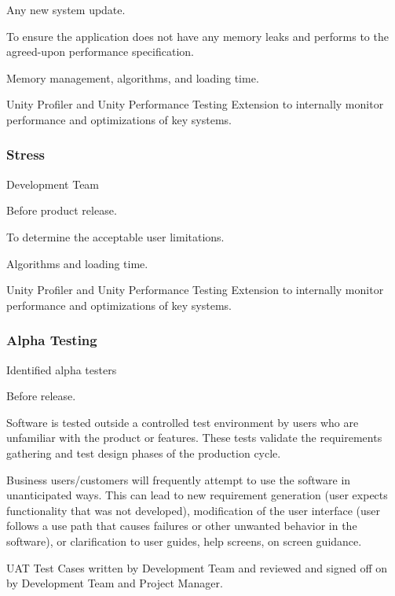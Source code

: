 \documentclass[letterpaper,10pt,english]{sphinxmanual}
\begin{document}
 Any new system update.

 To ensure the application does not have any memory leaks and performs to the agreed-upon performance specification.

 Memory management, algorithms, and loading time.

 Unity Profiler and Unity Performance Testing Extension to internally monitor performance and optimizations of key systems.


\subsubsection{Stress}
\label{\detokenize{test_plan/strategy:stress}}
 Development Team

 Before product release.

 To determine the acceptable user limitations.

 Algorithms and loading time.

 Unity Profiler and Unity Performance Testing Extension to internally monitor performance and optimizations of key systems.


\subsubsection{Alpha Testing}
\label{\detokenize{test_plan/strategy:alpha-testing}}
 Identified alpha testers

 Before release.

 Software is tested outside a controlled test environment by users who are unfamiliar with the product or features. These tests validate the requirements gathering and test design phases of the production cycle.

 Business users/customers will frequently attempt to use the software in unanticipated ways. This can lead to new requirement generation (user expects functionality that was not developed), modification of the user interface (user follows a use path that causes failures or other unwanted behavior in the software), or clarification to user guides, help screens, on screen guidance.

 UAT Test Cases written by Development Team and reviewed and signed off on by Development Team and Project Manager.
\end{document}
